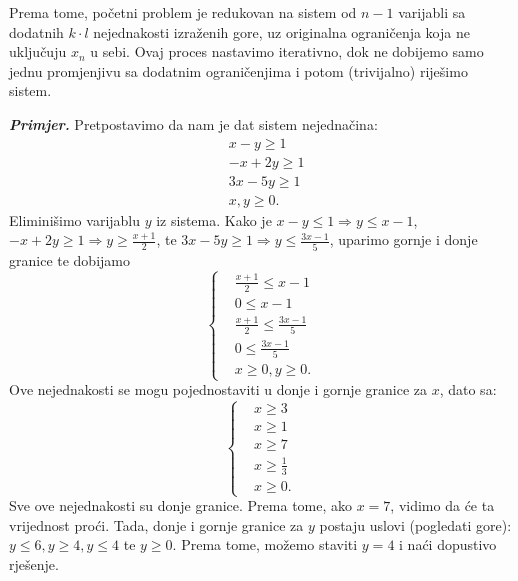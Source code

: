 \documentclass[a4paper, utf8, 11pt, colorlinks]{book}
\begin{document}
Prema tome, početni problem je redukovan na sistem od $n-1$ varijabli sa dodatnih  $k \cdot l$ nejednakosti izraženih gore, uz originalna ograničenja koja ne uključuju $x_n$ u sebi. Ovaj proces nastavimo iterativno, dok ne dobijemo samo jednu promjenjivu sa dodatnim ograničenjima  i potom (trivijalno) riješimo sistem. 

\emph{\textbf{Primjer.}} Pretpostavimo da nam je dat sistem nejednačina:
\begin{align*}
	 &x - y \geq 1 \\
	 &-x + 2y \geq 1 \\
	 & 3x - 5y \geq 1 \\
	 & x,y \geq 0.
\end{align*}
Eliminišimo varijablu $y$ iz sistema. Kako je $x-y \leq 1 \Rightarrow y \leq x -1 $, 
$-x + 2y \geq 1 \Rightarrow y \geq \frac{x+1}{2}$, te $ 3x - 5y \geq 1 \Rightarrow y \leq \frac{3x-1}{5}$, uparimo gornje i donje granice te dobijamo 
 $$
 \begin{cases}
 	&\frac{x+1}{2} \leq x-1 \\
 	& 0 \leq x-1 \\
 	& \frac{x+1}{2} \leq \frac{3x-1}{5} \\
 	& 0 \leq \frac{3x-1}{5} \\
 	& x \geq 0, y \geq 0.  	
 \end{cases}
 $$
Ove nejednakosti se mogu pojednostaviti u donje i gornje granice za $x$, dato sa:
$$
\begin{cases}
    &x \geq 3 \\
    & x \geq 1 \\
    & x \geq 7 \\
    & x \geq \frac{1}{3} \\
    & x \geq 0.	
\end{cases}
$$
Sve ove nejednakosti su donje granice. Prema tome, ako $x=7$, vidimo da će ta vrijednost proći. 
Tada, donje i gornje granice za $y$ postaju uslovi (pogledati gore): $y \leq 6, y \geq 4, y \leq 4$ te $y \geq 0$. Prema tome, možemo staviti $y=4$ i naći dopustivo rješenje. 
\end{document}
